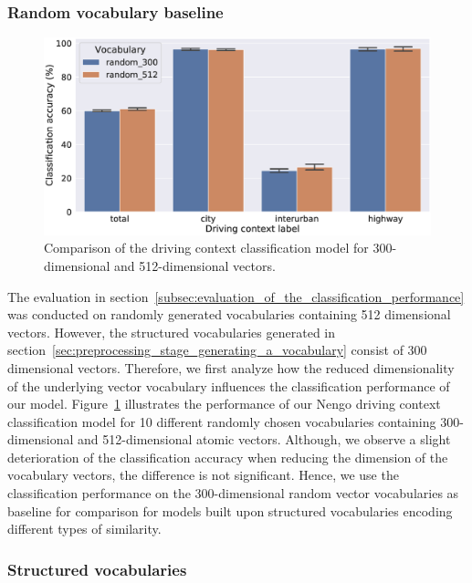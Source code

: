 \subsubsection{Random vocabulary baseline}%
\label{ssubsec:random_vocabulary_baseline}

\begin{figure}[t]
    \centering
    \includegraphics[width=1.\linewidth]{imgs/context_class_random_512_vs_random_300_dim_vocab.eps}
    \caption{Comparison of the driving context classification model for \num{300}-dimensional and \num{512}-dimensional vectors.}
    \label{fig:context_class_random_512_vs_random_300_dim_vocab}
\end{figure}

The evaluation in section~\ref{subsec:evaluation_of_the_classification_performance} was conducted on randomly generated vocabularies containing \num{512} dimensional vectors.
However, the structured vocabularies generated in section~\ref{sec:preprocessing_stage_generating_a_vocabulary} consist of \num{300} dimensional vectors.
Therefore, we first analyze how the reduced dimensionality of the underlying vector vocabulary influences the classification performance of our model.
Figure~\ref{fig:context_class_random_512_vs_random_300_dim_vocab} illustrates the performance of our \ac{Nengo} driving context classification model for \num{10} different randomly chosen vocabularies containing \num{300}-dimensional and \num{512}-dimensional atomic vectors.
Although, we observe a slight deterioration of the classification accuracy when reducing the dimension of the vocabulary vectors, the difference is not significant.
Hence, we use the classification performance on the \num{300}-dimensional random vector vocabularies as baseline for comparison for models built upon structured vocabularies encoding different types of similarity.

\subsubsection{Structured vocabularies}%
\label{ssubsec:structured_vocabularies}

